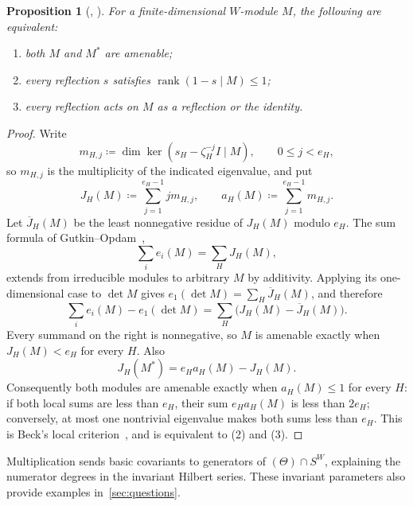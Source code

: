 \documentclass[11pt]{amsart}
\newcommand{\defeq}{\coloneqq}
\newtheorem{proposition}[theorem]{Proposition}
\theoremstyle{definition}
\begin{document}
\begin{proposition}[{\cite[Lemma 2.1]{Opdam}, \cite[Remark 1(i)]{Beck}}]
\label{a:prop:two-sided-amenability}
For a finite-dimensional $W$-module $M$, the following are equivalent:
\begin{enumerate}
\item both $M$ and $M^*$ are amenable;
\item every reflection $s$ satisfies $\operatorname{rank}(1-s\mid M)\leq1$;
\item every reflection acts on $M$ as a reflection or the identity.
\end{enumerate}
\end{proposition}
\begin{proof}
Write
\[
 m_{H,j}\defeq\dim\ker(s_H-\zeta_H^{-j}I\mid M),
 \qquad 0\leq j<e_H,
\]
so $m_{H,j}$ is the multiplicity of the indicated eigenvalue, and put
\[
 J_H(M)\defeq\sum_{j=1}^{e_H-1}j m_{H,j},\qquad
 a_H(M)\defeq\sum_{j=1}^{e_H-1}m_{H,j}.
\]
Let $\overline J_H(M)$ be the least nonnegative residue of $J_H(M)$
modulo $e_H$. The sum formula of Gutkin--Opdam~\cite[Lemma 2.1]{Opdam},
\[
 \sum_i e_i(M)=\sum_H J_H(M),
\]
extends from irreducible modules to arbitrary $M$ by additivity.
Applying its one-dimensional case to $\det M$ gives
$e_1(\det M)=\sum_H\overline J_H(M)$, and therefore
\[
 \sum_i e_i(M)-e_1(\det M)
 =\sum_H\bigl(J_H(M)-\overline J_H(M)\bigr).
\]
Every summand on the right is nonnegative, so $M$ is
amenable exactly when $J_H(M)<e_H$ for every $H$. Also
\[
 J_H(M^*)=e_Ha_H(M)-J_H(M).
\]
Consequently both modules are amenable exactly when $a_H(M)\leq1$
for every $H$: if both local sums are less than $e_H$, their sum
$e_Ha_H(M)$ is less than $2e_H$; conversely, at most one nontrivial
eigenvalue makes both sums less than $e_H$. This is Beck's local
criterion~\cite[Remark 1(i)]{Beck}, and is equivalent to (2) and (3).
\end{proof}

Multiplication sends basic covariants to generators of
$(\Theta)\cap S^W$, explaining the numerator degrees in the invariant
Hilbert series. These invariant parameters also provide examples
in~\cref{sec:questions}.
\end{document}

